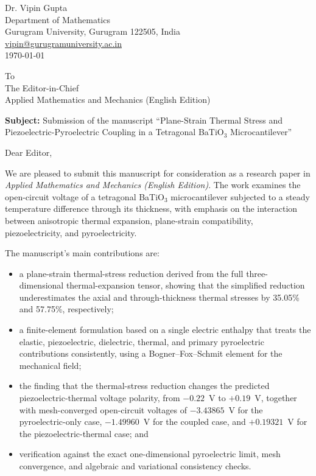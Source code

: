 \documentclass[11pt,a4paper]{article}
\begin{document}
\begin{flushright}
Dr. Vipin Gupta\\
Department of Mathematics\\
Gurugram University, Gurugram 122505, India\\
\href{mailto:vipin@gurugramuniversity.ac.in}{vipin@gurugramuniversity.ac.in}\\[6pt]
\today
\end{flushright}

To\\
The Editor-in-Chief\\
Applied Mathematics and Mechanics (English Edition)

{\raggedright
\textbf{Subject:} Submission of the manuscript ``Plane-Strain Thermal Stress and
Piezoelectric-Pyroelectric Coupling in a Tetragonal BaTiO$_3$ Microcantilever''
\par}

Dear Editor,

We are pleased to submit this manuscript for consideration as a research paper in
\emph{Applied Mathematics and Mechanics (English Edition)}. The work examines the
open-circuit voltage of a tetragonal BaTiO$_3$ microcantilever subjected to a steady
temperature difference through its thickness, with emphasis on the interaction between
anisotropic thermal expansion, plane-strain compatibility, piezoelectricity, and
pyroelectricity.

The manuscript's main contributions are:
\begin{itemize}[leftmargin=1.5em,itemsep=2pt,topsep=2pt]
\item a plane-strain thermal-stress reduction derived from the full three-dimensional
thermal-expansion tensor, showing that the simplified reduction underestimates the
axial and through-thickness thermal stresses by 35.05\% and 57.75\%, respectively;
\item a finite-element formulation based on a single electric enthalpy that treats the
elastic, piezoelectric, dielectric, thermal, and primary pyroelectric contributions
consistently, using a Bogner--Fox--Schmit element for the mechanical field;
\item the finding that the thermal-stress reduction changes the predicted
piezoelectric-thermal voltage polarity, from $-0.22$~V to $+0.19$~V, together with
mesh-converged open-circuit voltages of $-3.43865$~V for the pyroelectric-only case,
$-1.49960$~V for the coupled case, and $+0.19321$~V for the piezoelectric-thermal
case; and
\item verification against the exact one-dimensional pyroelectric limit, mesh
convergence, and algebraic and variational consistency checks.
\end{itemize}
\end{document}

